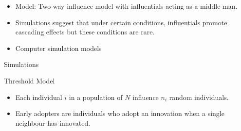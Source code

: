 \documentclass[10pt, oneside, reqno]{amsart}
\theoremstyle{plain}%
\theoremstyle{definition}
\theoremstyle{remark}
\begin{document}
\begin{itemize}
    \item Model: Two-way influence model with influentials acting as a middle-man.
    \item Simulations suggest that under certain conditions, influentials promote 
    cascading effects but these conditions are rare.
    \item Computer simulation models 
\end{itemize}


Simulations 

Threshold Model
\begin{itemize}
    \item Each individual $i$ in a population of $N$ influence $n_i$ random individuals.
    \item Early adopters are individuals who adopt an innovation when a single neighbour has innovated.
\end{itemize}
\end{document}
